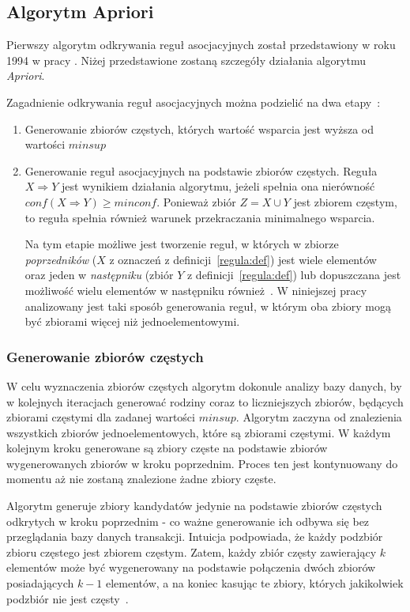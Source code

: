 \subsection{Algorytm Apriori}
Pierwszy algorytm odkrywania reguł asocjacyjnych został przedstawiony w roku 1994 w pracy \cite{Apriori:Main}. Niżej przedstawione zostaną szczegóły działania algorytmu \emph{Apriori}.

Zagadnienie odkrywania reguł asocjacyjnych można podzielić na dwa etapy~\cite{Problem:Statement}:
\begin{enumerate}
	\item Generowanie zbiorów częstych, których wartość wsparcia jest wyższa od wartości $minsup$
	\item Generowanie reguł asocjacyjnych na podstawie zbiorów częstych. Reguła $X \Rightarrow Y$ jest wynikiem działania algorytmu, jeżeli spełnia ona nierówność $conf(X \Rightarrow Y) \geq minconf$. Ponieważ zbiór $Z = X \cup Y$ jest zbiorem częstym, to reguła spełnia również warunek przekraczania minimalnego wsparcia.

	Na tym etapie możliwe jest tworzenie reguł, w których w zbiorze \emph{poprzedników} ($X$ z oznaczeń z definicji~\ref{regula:def}) jest wiele elementów~\cite{Problem:Statement} oraz jeden w \emph{następniku} (zbiór $Y$ z definicji~\ref{regula:def}) lub dopuszczana jest możliwość wielu elementów w następniku również~\cite{Apriori:Main}. W niniejszej pracy analizowany jest taki sposób generowania reguł, w którym oba zbiory mogą być zbiorami więcej niż jednoelementowymi.
\end{enumerate}



\subsubsection{Generowanie zbiorów częstych}
W celu wyznaczenia zbiorów częstych algorytm dokonule analizy bazy danych, by w kolejnych iteracjach generować rodziny coraz to liczniejszych zbiorów, będących zbiorami częstymi dla zadanej wartości $minsup$. Algorytm zaczyna od znalezienia wszystkich zbiorów jednoelementowych, które są zbiorami częstymi. W każdym kolejnym kroku generowane są zbiory częste na podstawie zbiorów wygenerowanych zbiorów w kroku poprzednim. Proces ten jest kontynuowany do momentu aż nie zostaną znalezione żadne zbiory częste.

Algorytm generuje zbiory kandydatów jedynie na podstawie zbiorów częstych odkrytych w kroku poprzednim - co ważne generowanie ich odbywa się bez przeglądania bazy danych transakcji. Intuicja podpowiada, że każdy podzbiór zbioru częstego jest zbiorem częstym. Zatem, każdy zbiór częsty zawierający $k$ elementów może być wygenerowany na podstawie połączenia dwóch zbiorów posiadających $k-1$ elementów, a na koniec kasując te zbiory, których jakikolwiek podzbiór nie jest częsty~\cite{Apriori:Main}.

